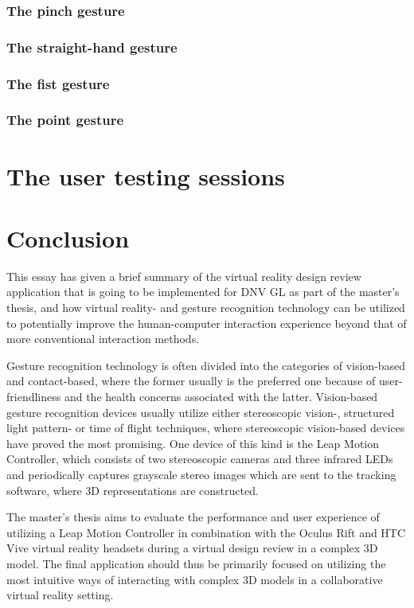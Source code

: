 \documentclass[UKenglish]{ifimaster}
\begin{document}
\subsection{The pinch gesture}
\subsection{The straight-hand gesture}
\subsection{The fist gesture}
\subsection{The point gesture}

\chapter{The user testing sessions}




\chapter{Conclusion}
This essay has given a brief summary of the virtual reality design review application that is going to be implemented for DNV GL as part of the master's thesis, and how virtual reality- and gesture recognition technology can be utilized to potentially improve the human-computer interaction experience beyond that of more conventional interaction methods. 

Gesture recognition technology is often divided into the categories of vision-based and contact-based, where the former usually is the preferred one because of user-friendliness and the health concerns associated with the latter. Vision-based gesture recognition devices usually utilize either stereoscopic vision-, structured light pattern- or time of flight techniques, where stereoscopic vision-based devices have proved the most promising. One device of this kind is the Leap Motion Controller, which consists of two stereoscopic cameras and three infrared LEDs and periodically captures grayscale stereo images which are sent to the tracking software, where 3D representations are constructed. 

The master's thesis aims to evaluate the performance and user experience of utilizing a Leap Motion Controller in combination with the Oculus Rift and HTC Vive virtual reality headsets during a virtual design review in a complex 3D model. The final application should thus be primarily focused on utilizing the most intuitive ways of interacting with complex 3D models in a collaborative virtual reality setting.     	                                     
\end{document}
